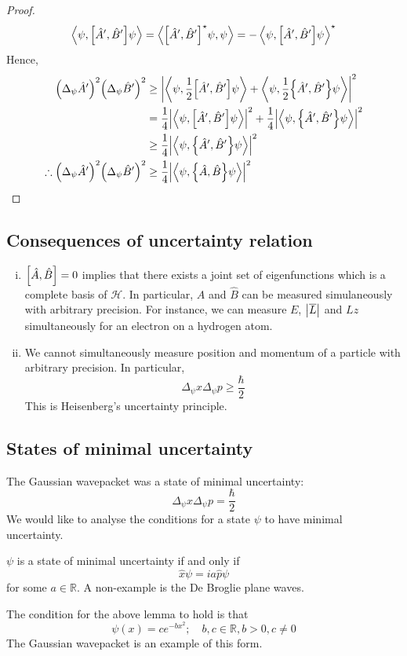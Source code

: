 \begin{proof}
	\[
		\left\langle{\psi, \qty[\hat A', \hat B'] \psi}\right\rangle = \left\langle{\qty[\hat A', \hat B']^\star \psi, \psi}\right\rangle = -\left\langle{\psi, \qty[\hat A', \hat B'] \psi}\right\rangle^\star
	\]
	Hence,
	\begin{align*}
		\qty(\Delta_\psi \hat A')^2 \qty(\Delta_\psi \hat B')^2            & \geq \abs{\left\langle{\psi, \frac{1}{2} \qty[\hat A', \hat B'] \psi}\right\rangle + \left\langle{\psi, \frac{1}{2} \qty{\hat A', \hat B'} \psi}\right\rangle}^2     \\
		                                                                   & = \frac{1}{4} \abs{\left\langle{\psi, \qty[\hat A', \hat B'] \psi}\right\rangle}^2 + \frac{1}{4} \abs{\left\langle{\psi, \qty{\hat A', \hat B'}\psi}\right\rangle}^2 \\
		                                                                   & \geq \frac{1}{4} \abs{\left\langle{\psi, \qty{\hat A', \hat B'} \psi}\right\rangle}^2                                                             \\
		\therefore \qty(\Delta_\psi \hat A')^2 \qty(\Delta_\psi \hat B')^2 & \geq \frac{1}{4} \abs{\left\langle{\psi, \qty{\hat A, \hat B} \psi}\right\rangle}^2
	\end{align*}
\end{proof}

\subsection{Consequences of uncertainty relation}
\begin{enumerate}[(i)]
	\item \( \qty[\hat A, \hat B] = 0 \) implies that there exists a joint set of eigenfunctions which is a complete basis of \( \mathcal H \).
	      In particular, \( \hat A \) and \( \hat B \) can be measured simulaneously with arbitrary precision.
	      For instance, we can measure \( E \), \( \abs{\overline L} \) and \( L z \) simultaneously for an electron on a hydrogen atom.
	\item We cannot simultaneously measure position and momentum of a particle with arbitrary precision.
	      In particular,
	      \[
		      \Delta_\psi x \Delta_\psi p \geq \frac{\hbar}{2}
	      \]
	      This is Heisenberg's uncertainty principle.
\end{enumerate}

\subsection{States of minimal uncertainty}
The Gaussian wavepacket was a state of minimal uncertainty:
\[
	\Delta_\psi x \Delta_\psi p = \frac{\hbar}{2}
\]
We would like to analyse the conditions for a state \( \psi \) to have minimal uncertainty.
\begin{lemma}
	\( \psi \) is a state of minimal uncertainty if and only if
	\[
		\hat x \psi = i a \hat p \psi
	\]
	for some \( a \in \mathbb R \).
	A non-example is the De Broglie plane waves.
\end{lemma}
\begin{lemma}
	The condition for the above lemma to hold is that
	\[
		\psi(x) = ce^{-bx^2};\quad b,c \in \mathbb R, b > 0, c \neq 0
	\]
	The Gaussian wavepacket is an example of this form.
\end{lemma}

